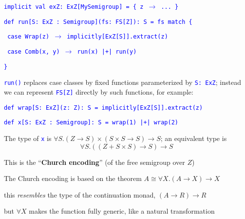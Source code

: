 \texttt{\textcolor{blue}{\footnotesize{}implicit val exZ: ExZ{[}MySemigroup{]}
= \{ z $\rightarrow$ ... \}}}{\footnotesize\par}

\texttt{\textcolor{blue}{\footnotesize{}def run{[}S: ExZ : Semigroup{]}(fs: FS{[}Z{]}): S
= fs match \{}}{\footnotesize\par}

\texttt{\textcolor{blue}{\footnotesize{}  case Wrap(z) $\rightarrow$
implicitly{[}ExZ{[}S{]}{]}.extract(z)}}{\footnotesize\par}

\texttt{\textcolor{blue}{\footnotesize{}  case Comb(x, y) $\rightarrow$
run(x) |+| run(y)}}{\footnotesize\par}

\texttt{\textcolor{blue}{\footnotesize{}\}}}{\footnotesize\par}

\texttt{\textcolor{blue}{\footnotesize{}run()}} replaces case classes
by fixed functions parameterized by \texttt{\textcolor{blue}{\footnotesize{}S:~ExZ}};
instead we can represent \texttt{\textcolor{blue}{\footnotesize{}FS{[}Z{]}}}
directly by such functions, for example:

\texttt{\textcolor{blue}{\footnotesize{}def wrap{[}S: ExZ{]}(z: Z): S
= implicitly{[}ExZ{[}S{]}{]}.extract(z)}}{\footnotesize\par}

\texttt{\textcolor{blue}{\footnotesize{}def x{[}S: ExZ : Semigroup{]}: S
= wrap(1) |+| wrap(2)}}{\footnotesize\par}

The type of \texttt{\textcolor{blue}{\footnotesize{}x}} is {\footnotesize{}$\forall S.\left(Z\rightarrow S\right)\times\left(S\times S\rightarrow S\right)\rightarrow S$};
an equivalent type is{\footnotesize{}
\[
\forall S.\left(\left(Z+S\times S\right)\rightarrow S\right)\rightarrow S
\]
}{\footnotesize\par}

This is the \textsf{``}\textbf{Church encoding}\textsf{''} (of the free semigroup
over $Z$)

The Church encoding is based on the theorem {\footnotesize{}$A\cong\forall X.\left(A\rightarrow X\right)\rightarrow X$} 

this \emph{resembles} the type of the continuation monad, $\left(A\rightarrow R\right)\rightarrow R$ 

but $\forall X$ makes the function fully generic, like a natural
transformation


